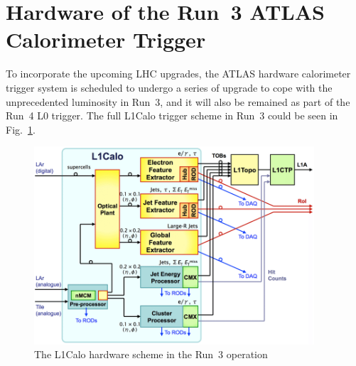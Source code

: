 \section{Hardware of the Run~3 ATLAS Calorimeter Trigger}
To incorporate the upcoming LHC upgrades, the ATLAS hardware calorimeter trigger system is scheduled to undergo a series of upgrade to cope with the unprecedented luminosity in Run~3, and it will also be remained as part of the Run~4 L0 trigger. The full L1Calo trigger scheme in Run~3 could be seen in Fig.~\ref{Fig:l1calo_scheme}.
\begin{figure}[!h]                
	\includegraphics[width=0.93\textwidth]{Chapter6/L1Calo.png}
	\begin{center}
		\caption{The L1Calo hardware scheme in the Run~3 operation\cite{Schwienhorst:2016efd}}
		\label{Fig:l1calo_scheme}            
	\end{center}
\end{figure}
\noindent
